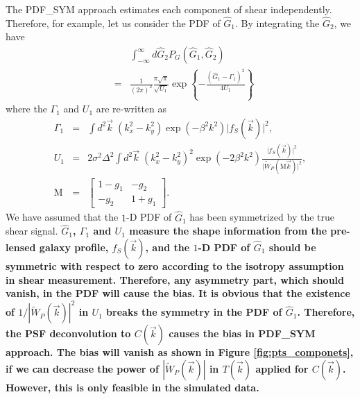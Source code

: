 \documentclass[twocolumn]{aastex62}
\begin{document}
The PDF\_SYM approach estimates each component of shear independently. Therefore, for example, let us consider the PDF of $\hat{G}_1$. By integrating the $\hat{G}_2$, we have
\begin{eqnarray}
\label{1d_PDF}
&&\int_{-\infty}^{\infty}d\hat{G}_2 P_G\left(\hat{G}_1,\hat{G}_2\right)\\ \nonumber
&=&\frac{1}{(2\pi)^2}\frac{\pi\sqrt{\pi}}{\sqrt{U_1}}\exp\left\{-\frac{\left(\hat{G}_1-\Gamma_1\right)^2}{4U_1}\right\}
\end{eqnarray}
where the $\Gamma_1$ and $U_1$ are re-written as
\begin{eqnarray}
\Gamma_1&=&\int{d}^2\vec{k}\;\left(k_x^2-k_y^2\right)\exp(-\beta^2k^2)\vert f_S(\vec{k})\vert^2, \\ \nonumber
U_1&=&2\sigma^2\Delta^2\int{d}^2\vec{k} \; \left(k_x^2-k_y^2\right)^2\exp(-2\beta^2k^2)\frac{\vert f_S(\vec{k})\vert^2}{\vert \widetilde{W}_{P}(\mathrm{M}\vec{k})\vert^2}, \\ \nonumber
\mathrm{M}&=&\left[\begin{array}{cc}
1-g_1 &  -g_2 \\
-g_2 &  1+g_1 
\end{array}\right].
\end{eqnarray}
We have assumed that the $1$-D PDF of $\hat{G}_1$ has been symmetrized by the true shear signal. \textbf{$\hat{G}_1$, $\Gamma_1$ and $U_1$ measure the shape information from the pre-lensed galaxy profile, $f_S(\vec{k})$, and the $1$-D PDF of $\hat{G}_1$ should be symmetric with respect to zero according to the isotropy assumption in shear measurement. Therefore, any asymmetry part, which should vanish, in the PDF will cause the bias. It is obvious that the existence of $1/|\widetilde{W}_{P}(\vec{k})|^2$ in $U_1$ breaks the symmetry in the PDF of $\hat{G}_1$. Therefore, the PSF deconvolution to $C(\vec{k})$ causes the bias in PDF\_SYM approach. The bias will vanish as shown in Figure \ref{fig:pts_componets}, if we can decrease the power of $|\widetilde{W}_{P}(\vec{k})|$ in $T(\vec{k})$ applied for $C(\vec{k})$. However, this is only feasible in the simulated data.}

\end{document}
